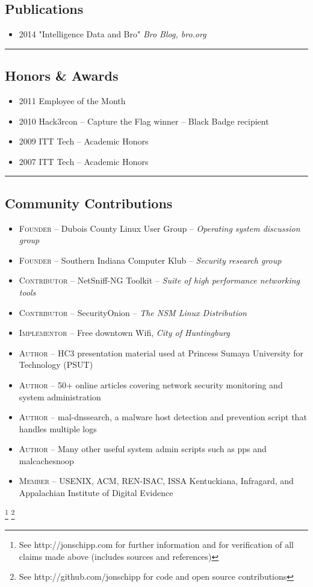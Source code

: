 \documentclass[10pt,letterpaper]{article}
\begin{document}
\subsection*{Publications}
\begin{itemize}
	\parskip=0.1em
	\item \textsc{2014} "Intelligence Data and Bro" \textit{Bro Blog, bro.org}
\end{itemize}

\hrule
\vspace{-0.4em}
\subsection*{Honors \& Awards}

\begin{itemize}
	\parskip=0.1em

	\item \textsc{2011} Employee of the Month
	\item \textsc{2010} Hack3rcon – Capture the Flag winner – Black Badge recipient
	\item \textsc{2009} ITT Tech – Academic Honors
	\item \textsc{2007} ITT Tech – Academic Honors

\end{itemize}

\hrule
\vspace{-0.4em}
\subsection*{Community Contributions}

\begin{itemize}
	\parskip=0.1em

	\item \textsc{Founder} -- Dubois County Linux User Group – \textit{Operating system discussion group}
	\item \textsc{Founder} -- Southern Indiana Computer Klub – \textit{Security research group}
	\item \textsc{Contributor} -- NetSniff-NG Toolkit – \textit{Suite of high performance networking tools}
	\item \textsc{Contributor} -- SecurityOnion – \textit{The NSM Linux Distribution}
	\item \textsc{Implementor} -- Free downtown Wifi, \textit{City of Huntingburg}
	\item \textsc{Author} -- HC3 presentation material used at Princess Sumaya University for Technology (PSUT)
	\item \textsc{Author} -- 50+ online articles covering network security monitoring and system administration
	\item \textsc{Author} -- mal-dnssearch, a malware host detection and prevention script that handles multiple logs
	\item \textsc{Author} -- Many other useful system admin scripts such as pps and malcachesnoop
	\item \textsc{Member} -- USENIX, ACM, REN-ISAC, ISSA Kentuckiana, Infragard, and Appalachian Institute of Digital Evidence

\end{itemize}

\let\thefootnote\relax\footnote{See http://jonschipp.com for further
information and for verification of all claims made above (includes sources and references)}
\let\thefootnote\relax\footnote{See http://github.com/jonschipp for code and open source contributions}
\end{document}
